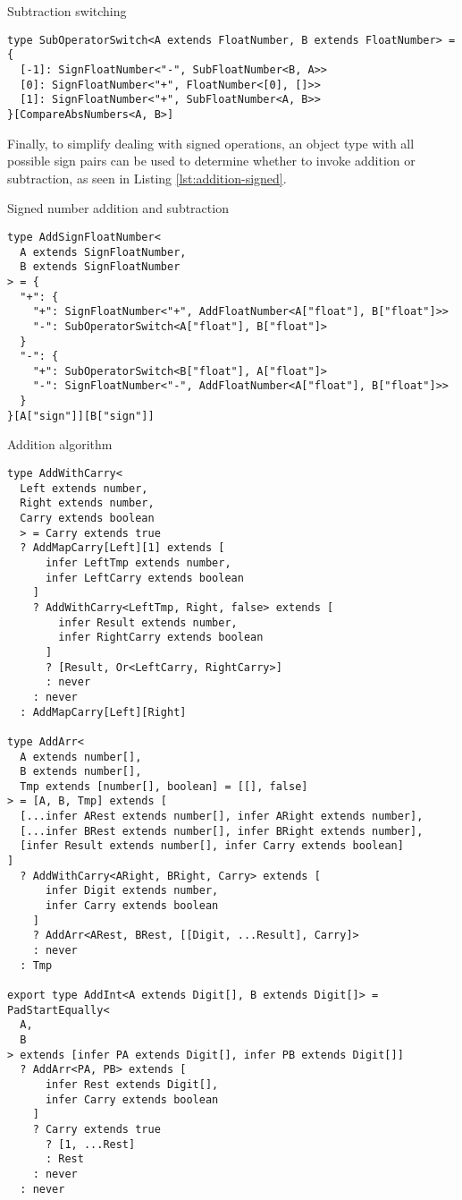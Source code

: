 \begin{listing}[ht!]
  \caption{Subtraction switching}\label{lst:subtractor-switching}
  \begin{verbatim}
type SubOperatorSwitch<A extends FloatNumber, B extends FloatNumber> = {
  [-1]: SignFloatNumber<"-", SubFloatNumber<B, A>>
  [0]: SignFloatNumber<"+", FloatNumber<[0], []>>
  [1]: SignFloatNumber<"+", SubFloatNumber<A, B>>
}[CompareAbsNumbers<A, B>]
\end{verbatim}
\end{listing}

Finally, to simplify dealing with signed operations, an object type with all possible sign pairs can be used to determine whether to invoke addition or subtraction, as seen in Listing \ref{lst:addition-signed}.

\begin{listing}[ht]
  \caption{Signed number addition and subtraction}\label{lst:addition-signed}
  \begin{verbatim}
type AddSignFloatNumber<
  A extends SignFloatNumber,
  B extends SignFloatNumber
> = {
  "+": {
    "+": SignFloatNumber<"+", AddFloatNumber<A["float"], B["float"]>>
    "-": SubOperatorSwitch<A["float"], B["float"]>
  }
  "-": {
    "+": SubOperatorSwitch<B["float"], A["float"]>
    "-": SignFloatNumber<"-", AddFloatNumber<A["float"], B["float"]>>
  }
}[A["sign"]][B["sign"]]
\end{verbatim}
\end{listing}


\begin{listing}[ht!]
  \caption{Addition algorithm}\label{lst:addition-algorithm}
  \begin{verbatim}
type AddWithCarry<
  Left extends number,
  Right extends number,
  Carry extends boolean
  > = Carry extends true
  ? AddMapCarry[Left][1] extends [
      infer LeftTmp extends number,
      infer LeftCarry extends boolean
    ]
    ? AddWithCarry<LeftTmp, Right, false> extends [
        infer Result extends number,
        infer RightCarry extends boolean
      ]
      ? [Result, Or<LeftCarry, RightCarry>]
      : never
    : never
  : AddMapCarry[Left][Right]

type AddArr<
  A extends number[],
  B extends number[],
  Tmp extends [number[], boolean] = [[], false]
> = [A, B, Tmp] extends [
  [...infer ARest extends number[], infer ARight extends number],
  [...infer BRest extends number[], infer BRight extends number],
  [infer Result extends number[], infer Carry extends boolean]
]
  ? AddWithCarry<ARight, BRight, Carry> extends [
      infer Digit extends number,
      infer Carry extends boolean
    ]
    ? AddArr<ARest, BRest, [[Digit, ...Result], Carry]>
    : never
  : Tmp

export type AddInt<A extends Digit[], B extends Digit[]> = PadStartEqually<
  A,
  B
> extends [infer PA extends Digit[], infer PB extends Digit[]]
  ? AddArr<PA, PB> extends [
      infer Rest extends Digit[],
      infer Carry extends boolean
    ]
    ? Carry extends true
      ? [1, ...Rest]
      : Rest
    : never
  : never
\end{verbatim}
\end{listing}
